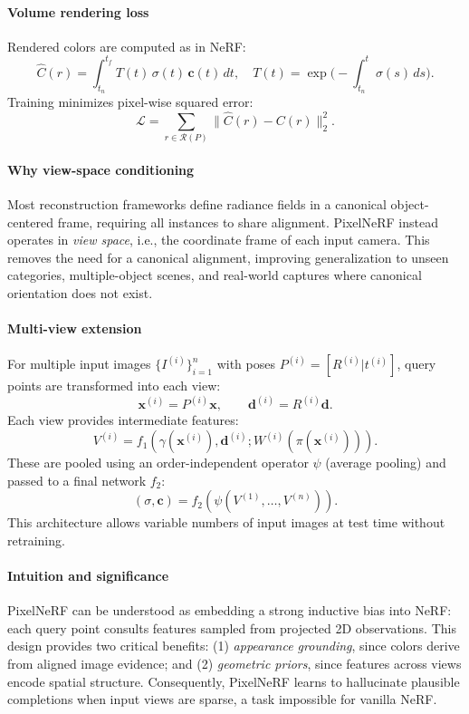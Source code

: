 \begin{enrichment}
\begin{enrichment}
     \paragraph{Volume rendering loss}  
     Rendered colors are computed as in NeRF:
     \[
     \hat{C}(r) = \int_{t_n}^{t_f} T(t)\,\sigma(t)\,\mathbf{c}(t)\, dt, 
     \quad
     T(t) = \exp\!\Big(-\int_{t_n}^t \sigma(s)\,ds\Big).
     \]
     Training minimizes pixel-wise squared error:
     \[
     \mathcal{L} = \sum_{r\in\mathcal{R}(P)} \| \hat{C}(r) - C(r)\|_2^2.
     \]
     
     \paragraph{Why view-space conditioning}  
     Most reconstruction frameworks define radiance fields in a canonical object-centered frame, requiring all instances to share alignment. PixelNeRF instead operates in \emph{view space}, i.e., the coordinate frame of each input camera. This removes the need for a canonical alignment, improving generalization to unseen categories, multiple-object scenes, and real-world captures where canonical orientation does not exist.
     
     \paragraph{Multi-view extension}  
     For multiple input images $\{I^{(i)}\}_{i=1}^n$ with poses $P^{(i)}=[R^{(i)}|t^{(i)}]$, query points are transformed into each view:
     \[
     \mathbf{x}^{(i)} = P^{(i)}\mathbf{x}, \qquad \mathbf{d}^{(i)} = R^{(i)}\mathbf{d}.
     \]
     Each view provides intermediate features:
     \[
     V^{(i)} = f_1(\gamma(\mathbf{x}^{(i)}), \mathbf{d}^{(i)}; W^{(i)}(\pi(\mathbf{x}^{(i)}))).
     \]
     These are pooled using an order-independent operator $\psi$ (average pooling) and passed to a final network $f_2$:
     \[
     (\sigma, \mathbf{c}) = f_2(\psi(V^{(1)}, \dots, V^{(n)})).
     \]
     This architecture allows variable numbers of input images at test time without retraining.
     
     \paragraph{Intuition and significance}  
     PixelNeRF can be understood as embedding a strong inductive bias into NeRF: each query point consults features sampled from projected 2D observations. This design provides two critical benefits: (1) \emph{appearance grounding}, since colors derive from aligned image evidence; and (2) \emph{geometric priors}, since features across views encode spatial structure. Consequently, PixelNeRF learns to hallucinate plausible completions when input views are sparse, a task impossible for vanilla NeRF.
     

\end{enrichment}
\end{enrichment}
